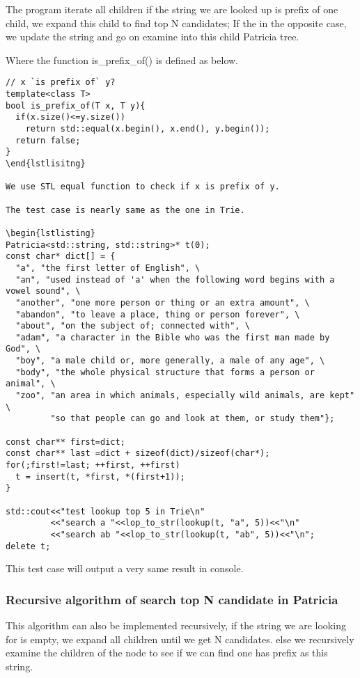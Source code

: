 \documentclass{article}
\begin{document}
The program iterate all children if the string we are looked up is
prefix of one child, we expand this child to find top N candidates; If
the in the opposite case, we update the string and go on examine into
this child Patricia tree.

Where the function is\_prefix\_of() is defined as below.

\begin{lstlisting}
// x `is prefix of` y?
template<class T>
bool is_prefix_of(T x, T y){
  if(x.size()<=y.size())
    return std::equal(x.begin(), x.end(), y.begin());
  return false;
}
\end{lstlisitng}

We use STL equal function to check if x is prefix of y.

The test case is nearly same as the one in Trie.

\begin{lstlisting}
Patricia<std::string, std::string>* t(0);
const char* dict[] = {
  "a", "the first letter of English", \
  "an", "used instead of 'a' when the following word begins with a vowel sound", \
  "another", "one more person or thing or an extra amount", \
  "abandon", "to leave a place, thing or person forever", \
  "about", "on the subject of; connected with", \
  "adam", "a character in the Bible who was the first man made by God", \
  "boy", "a male child or, more generally, a male of any age", \
  "body", "the whole physical structure that forms a person or animal", \
  "zoo", "an area in which animals, especially wild animals, are kept" \
         "so that people can go and look at them, or study them"};

const char** first=dict;
const char** last =dict + sizeof(dict)/sizeof(char*);
for(;first!=last; ++first, ++first)
  t = insert(t, *first, *(first+1));
}

std::cout<<"test lookup top 5 in Trie\n"
         <<"search a "<<lop_to_str(lookup(t, "a", 5))<<"\n"
         <<"search ab "<<lop_to_str(lookup(t, "ab", 5))<<"\n";
delete t;
\end{lstlisting}

This test case will output a very same result in console.

\subsubsection{Recursive algorithm of search top N candidate in
  Patricia}

This algorithm can also be implemented recursively, if the string we
are looking for is empty, we expand all children until we get N
candidates. else we recursively examine the children of the node to
see if we can find one has prefix as this string.
\end{document}

